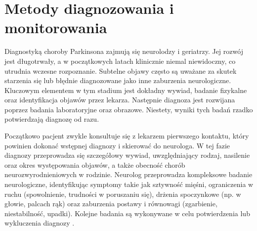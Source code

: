 \section{Metody diagnozowania i monitorowania}
\label{subsec:diagnostyka}

Diagnostyką choroby Parkinsona zajmują się neurolodzy i geriatrzy.
Jej rozwój jest długotrwały, a w początkowych latach klinicznie niemal niewidoczny, co utrudnia wczesne rozpoznanie.
Subtelne objawy często są uważane za skutek starzenia się lub błędnie diagnozowane jako inne zaburzenia neurologiczne.
Kluczowym elementem w tym stadium jest dokładny wywiad, badanie fizykalne oraz identyfikacja objawów przez lekarza.
Następnie diagnoza jest rozwijana poprzez badania laboratoryjne  oraz obrazowe.
Niestety, wyniki tych badań rzadko potwierdzają diagnozę od razu.

Początkowo pacjent zwykle konsultuje się z lekarzem pierwszego kontaktu, który powinien dokonać wstępnej diagnozy i skierować do neurologa.
W tej fazie diagnozy przeprowadza się szczegółowy wywiad, uwzględniający rodzaj, nasilenie oraz okres występowania objawów, a także
obecność chorób neurozwyrodnieniowych w rodzinie.
Neurolog przeprowadza kompleksowe badanie neurologiczne, identyfikując symptomy takie jak sztywność mięśni, ograniczenia w
ruchu (spowolnienie, trudności w poruszaniu się), drżenia spoczynkowe (np. w głowie, palcach rąk) oraz zaburzenia postawy i równowagi
(zgarbienie, niestabilność, upadki). Kolejne badania są wykonywane w celu potwierdzenia lub wykluczenia diagnozy \cite{diagnostyka_Sitek, Loscalzo_2022}.

